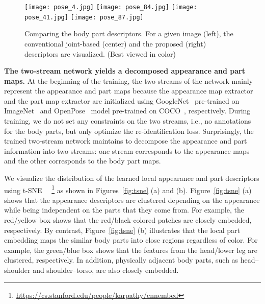 \documentclass{llncs}
\begin{document}
\begin{figure}[t]
     \begin{minipage}{0.99\linewidth}
\centering
      \texttt{[image: pose\_4.jpg]}
      \texttt{[image: pose\_84.jpg]}
      \texttt{[image: pose\_41.jpg]}
      \texttt{[image: pose\_87.jpg]}
    \end{minipage}
\vspace{-.1cm}
\caption{Comparing the body part descriptors. For a given image (left), the conventional joint-based (center) and the proposed (right) descriptors are visualized. (Best viewed in color)}
\label{fig:posemap_compare}
\vspace{-.5cm}
\end{figure}

\vspace{.1cm}
\noindent\textbf{The two-stream network yields a decomposed appearance and part maps.}
At the beginning of the training, the two streams of the network {\color{black}mainly represent the appearance and part maps because the appearance map extractor  and the part map extractor  are initialized using GoogleNet~\cite{googlenet} pre-trained on ImageNet~\cite{imagenet} and OpenPose~\cite{conf/cvpr/cao17} model pre-trained on COCO~\cite{coco}, respectively.}
During training, we do not set any constraints on the two streams, i.e., no annotations for the body parts, but only optimize the re-identification loss. Surprisingly, the trained two-stream network maintains to decompose the appearance and part information into two streams: one stream corresponds to the appearance maps and the other corresponds to the body part maps.

We visualize the distribution of the learned local appearance and part descriptors using t-SNE~\cite{tsne}
~\footnote{\url{https://cs.stanford.edu/people/karpathy/cnnembed}} as shown in Figures~\ref{fig:tsne} (a) and (b). Figure~\ref{fig:tsne} (a) shows that the appearance descriptors are clustered depending on the appearance while being independent on the parts that they come from. For example, the red/yellow box shows that the red/black-colored patches are closely embedded, respectively. By contrast, Figure~\ref{fig:tsne} (b) illustrates that the local part embedding maps the similar body parts into close regions regardless of color. For example, the green/blue box shows that the features from the head/lower leg are clustered, respectively. In addition, physically adjacent body parts, such as head--shoulder and shoulder--torso, are also closely embedded.
\end{document}
